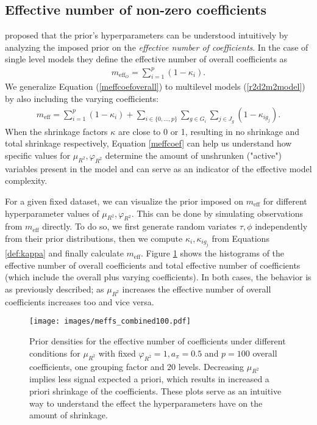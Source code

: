 \subsection{Effective number of non-zero coefficients}
\label{subsection:meff}
\cite{PiironenHorseshoe} proposed that the prior's hyperparameters can be understood intuitively by analyzing the imposed prior on the \textit{effective number of coefficients}. In the case of single level models they define the effective number of overall coefficients as
\begin{align}
\label{meffcoefoverall}
m_{\text{eff}_O}= \sum_{i=1}^{p}  (1-\kappa_i).
\end{align}
We generalize Equation (\ref{meffcoefoverall}) to multilevel models (\ref{r2d2m2model}) by also including the varying coefficients:
\begin{align}
\label{meffcoef}
m_{\text{eff}}= \sum_{i=1}^{p}  (1-\kappa_i)+\sum_{i \in \{0,...,p\}} \sum_{g \in G_i} \sum_{j \in J_g} (1-\kappa_{ig_j}).
\end{align}
When the shrinkage factors $\kappa$ are close to 0 or 1, resulting in no shrinkage and total shrinkage respectively, Equation \eqref{meffcoef} can help us understand how specific values for $\mu_{R^2}, \varphi_{R^2}$ determine the amount of unshrunken ("active") variables present in the model and can serve as an indicator of the effective model complexity.

For a given fixed dataset, we can visualize the prior imposed on $m_{\text{eff}}$ for different hyperparameter values of $\mu_{R^2}, \varphi_{R^2}$. This can be done by simulating observations from $m_{\text{eff}}$ directly. To do so, we first generate random variates $\tau, \phi$ independently from their prior distributions, then we compute $\kappa_i, \kappa_{ig_j}$ from Equations \eqref{def:kappa} and finally calculate $m_{\text{eff}}$. Figure \ref{fig:meffcombined10} shows the histograms of the effective number of overall coefficients and total effective number of coefficients (which include the overall plus varying coefficients). In both cases, the behavior is as previously described; as $\mu_{R^2}$ increases the effective number of overall coefficients increases too and vice versa.
 \begin{figure}[t!]%
	\centering
  	\texttt{[image: images/meffs\_combined100.pdf]}
	\caption{Prior densities for the effective number of coefficients under different conditions for $\mu_{R^2}$ with fixed $\varphi_{R^2} = 1, a_\pi=0.5$ and $p=100$ overall coefficients, one grouping factor and 20 levels.  Decreasing $\mu_{R^2}$ implies less signal expected a priori, which results in increased a priori shrinkage of the coefficients. These plots serve as an intuitive way to understand the effect the hyperparameters have on the amount of shrinkage. }
	\label{fig:meffcombined10}
\end{figure}

